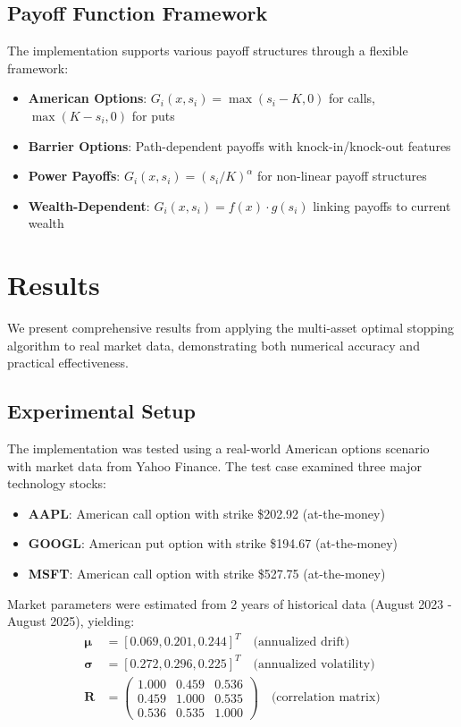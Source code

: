 \documentclass[11pt]{article}
\begin{document}
\subsection{Payoff Function Framework}
The implementation supports various payoff structures through a flexible framework:
\begin{itemize}
\item \textbf{American Options}: $G_i(x, s_i) = \max(s_i - K, 0)$ for calls, $\max(K - s_i, 0)$ for puts
\item \textbf{Barrier Options}: Path-dependent payoffs with knock-in/knock-out features
\item \textbf{Power Payoffs}: $G_i(x, s_i) = (s_i/K)^\alpha$ for non-linear payoff structures
\item \textbf{Wealth-Dependent}: $G_i(x, s_i) = f(x) \cdot g(s_i)$ linking payoffs to current wealth
\end{itemize}

\section{Results}

We present comprehensive results from applying the multi-asset optimal stopping algorithm to real market data, demonstrating both numerical accuracy and practical effectiveness.

\subsection{Experimental Setup}

The implementation was tested using a real-world American options scenario with market data from Yahoo Finance. The test case examined three major technology stocks:

\begin{itemize}
\item \textbf{AAPL}: American call option with strike \$202.92 (at-the-money)
\item \textbf{GOOGL}: American put option with strike \$194.67 (at-the-money)  
\item \textbf{MSFT}: American call option with strike \$527.75 (at-the-money)
\end{itemize}

Market parameters were estimated from 2 years of historical data (August 2023 - August 2025), yielding:
\begin{align}
\boldsymbol{\mu} &= [0.069, 0.201, 0.244]^T \quad \text{(annualized drift)} \\
\boldsymbol{\sigma} &= [0.272, 0.296, 0.225]^T \quad \text{(annualized volatility)} \\
\mathbf{R} &= \begin{pmatrix}
1.000 & 0.459 & 0.536 \\
0.459 & 1.000 & 0.535 \\
0.536 & 0.535 & 1.000
\end{pmatrix} \quad \text{(correlation matrix)}
\end{align}
\end{document}
